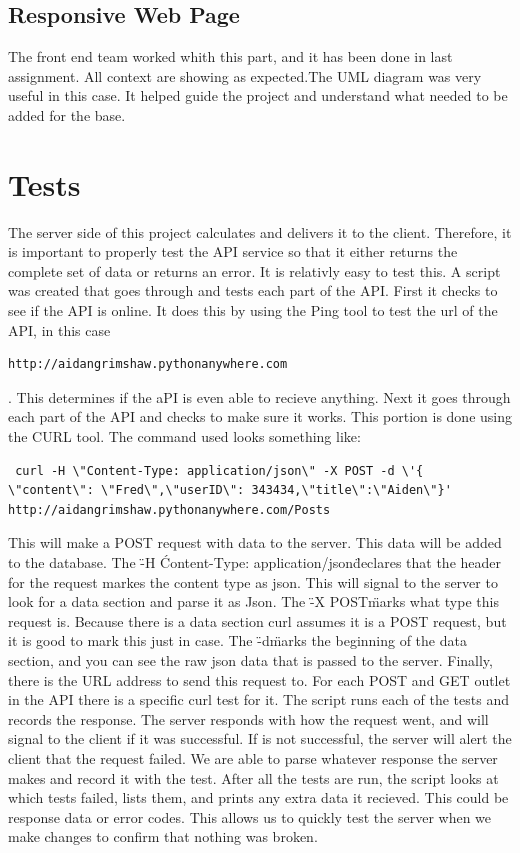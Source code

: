 \documentclass[12pt]{article}
\begin{document}
\subsection{Responsive Web Page}
The front end team worked whith this part, and it has been done in last
assignment. All context are showing as expected.The UML diagram was very useful
in this case. It helped guide the project and understand what needed to be added
for the base.

\section{Tests}

The server side of this project calculates and delivers it to the client.
Therefore, it is important to properly test the API service so that it either
returns the complete set of data or returns an error.  It is relativly easy to
test this.  A script was created that goes through and tests each part of the
API.  First it checks to see if the API is online.  It does this by using the
Ping tool to test the url of the API, in this case
\begin{verbatim}http://aidangrimshaw.pythonanywhere.com \end{verbatim}.  This
determines if the aPI is even able to recieve anything.  Next it goes through
each part of the API and checks to make sure it works.  This portion is done
using the CURL tool.  The command used looks something like:

\begin{verbatim} curl -H \"Content-Type: application/json\" -X POST -d \'{
\"content\": \"Fred\",\"userID\": 343434,\"title\":\"Aiden\"}'
http://aidangrimshaw.pythonanywhere.com/Posts \end{verbatim}

This will make a POST request with data to the server.  This data will be added
to the database.  The \"-H \'Content-Type: application/json\" declares that the
header for the request markes the content type as json.  This will signal to the
server to look for a data section and parse it as Json.  The \"-X POST\" marks
what type this request is.  Because there is a data section curl assumes it is a
POST request, but it is good to mark this just in case.  The \"-d\" marks the
beginning of the data section, and you can see the raw json data that is passed
to the server.  Finally, there is the URL address to send this request to.  For
each POST and GET outlet in the API there is a specific curl test for it.  The
script runs each of the tests and records the response.  The server responds
with how the request went, and will signal to the client if it was successful.
If is not successful, the server will alert the client that the request failed.
We are able to parse whatever response the server makes and record it with the
test.  After all the tests are run, the script looks at which tests failed,
lists them, and prints any extra data it recieved.  This could be response data
or error codes.  This allows us to quickly test the server when we make changes
to confirm that nothing was broken.
\end{document}
